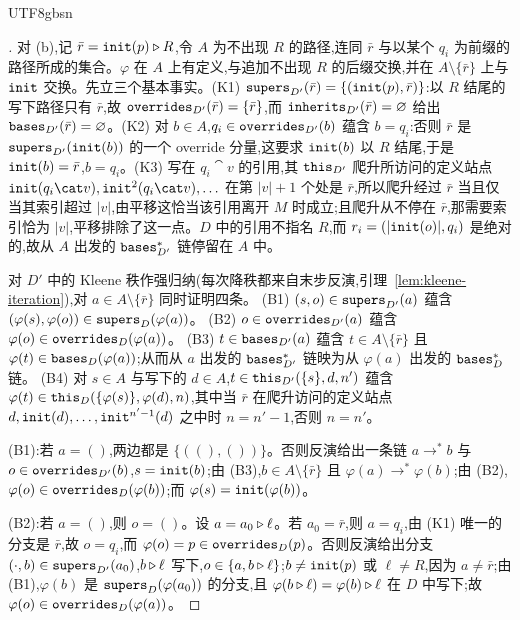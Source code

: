 \begin{CJK*}{UTF8}{gbsn}
\begin{proof}[]
\begin{sloppypar}
对 (b),记 $\bar r = \mathtt{init}(p) \mathbin{\triangleright} R$,令 $A$ 为不出现 $R$ 的路径,连同 $\bar r$ 与以某个 $q_i$ 为前缀的路径所成的集合。$\varphi$ 在 $A$ 上有定义,与追加不出现 $R$ 的后缀交换,并在 $A \setminus \{\bar r\}$ 上与 $\mathtt{init}$ 交换。先立三个基本事实。(K1) $\mathtt{supers}_{D'}(\bar r) = \{(\mathtt{init}(p), \bar r)\}$:以 $R$ 结尾的写下路径只有 $\bar r$,故 $\mathtt{overrides}_{D'}(\bar r) = \{\bar r\}$,而 $\mathtt{inherits}_{D'}(\bar r) = \varnothing$ 给出 $\mathtt{bases}_{D'}(\bar r) = \varnothing$。(K2) 对 $b \in A$,$q_i \in \mathtt{overrides}_{D'}(b)$ 蕴含 $b = q_i$:否则 $\bar r$ 是 $\mathtt{supers}_{D'}(\mathtt{init}(b))$ 的一个 override 分量,这要求 $\mathtt{init}(b)$ 以 $R$ 结尾,于是 $\mathtt{init}(b) = \bar r$,$b = q_i$。(K3) 写在 $q_i \cat v$ 的引用,其 $\mathtt{this}_{D'}$ 爬升所访问的定义站点 $\init(q_i \cat v), \init^2(q_i \cat v), \ldots$ 在第 $|v| + 1$ 个处是 $\bar r$,所以爬升经过 $\bar r$ 当且仅当其索引超过 $|v|$,由平移这恰当该引用离开 $M$ 时成立;且爬升从不停在 $\bar r$,那需要索引恰为 $|v|$,平移排除了这一点。$D$ 中的引用不指名 $R$,而 $r_i = (|\mathtt{init}(o)|, q_i)$ 是绝对的,故从 $A$ 出发的 $\mathtt{bases}^*_{D'}$ 链停留在 $A$ 中。

对 $D'$ 中的 Kleene 秩作强归纳(每次降秩都来自末步反演,引理~\ref{lem:kleene-iteration}),对 $a \in A \setminus \{\bar r\}$ 同时证明四条。
(B1) $(s, o) \in \mathtt{supers}_{D'}(a)$ 蕴含 $(\varphi(s), \varphi(o)) \in \mathtt{supers}_D(\varphi(a))$。
(B2) $o \in \mathtt{overrides}_{D'}(a)$ 蕴含 $\varphi(o) \in \mathtt{overrides}_D(\varphi(a))$。
(B3) $t \in \mathtt{bases}_{D'}(a)$ 蕴含 $t \in A \setminus \{\bar r\}$ 且 $\varphi(t) \in \mathtt{bases}_D(\varphi(a))$;从而从 $a$ 出发的 $\mathtt{bases}^*_{D'}$ 链映为从 $\varphi(a)$ 出发的 $\mathtt{bases}^*_D$ 链。
(B4) 对 $s \in A$ 与写下的 $d \in A$,$t \in \mathtt{this}_{D'}(\{s\}, d, n')$ 蕴含 $\varphi(t) \in \mathtt{this}_D(\{\varphi(s)\}, \varphi(d), n)$,其中当 $\bar r$ 在爬升访问的定义站点 $d, \mathtt{init}(d), \ldots, \mathtt{init}^{n'-1}(d)$ 之中时 $n = n' - 1$,否则 $n = n'$。

(B1):若 $a = ()$,两边都是 $\{((), ())\}$。否则反演给出一条链 $a \to^* b$ 与 $o \in \mathtt{overrides}_{D'}(b)$,$s = \mathtt{init}(b)$;由 (B3),$b \in A \setminus \{\bar r\}$ 且 $\varphi(a) \to^* \varphi(b)$;由 (B2),$\varphi(o) \in \mathtt{overrides}_D(\varphi(b))$;而 $\varphi(s) = \mathtt{init}(\varphi(b))$。

(B2):若 $a = ()$,则 $o = ()$。设 $a = a_0 \mathbin{\triangleright} \ell$。若 $a_0 = \bar r$,则 $a = q_i$,由 (K1) 唯一的分支是 $\bar r$,故 $o = q_i$,而 $\varphi(o) = p \in \mathtt{overrides}_D(p)$。否则反演给出分支 $(\cdot, b) \in \mathtt{supers}_{D'}(a_0)$,$b \mathbin{\triangleright} \ell$ 写下,$o \in \{a, b \mathbin{\triangleright} \ell\}$;$b \ne \mathtt{init}(p)$ 或 $\ell \ne R$,因为 $a \ne \bar r$;由 (B1),$\varphi(b)$ 是 $\mathtt{supers}_D(\varphi(a_0))$ 的分支,且 $\varphi(b \mathbin{\triangleright} \ell) = \varphi(b) \mathbin{\triangleright} \ell$ 在 $D$ 中写下;故 $\varphi(o) \in \mathtt{overrides}_D(\varphi(a))$。


\end{sloppypar}
\end{proof}
\end{CJK*}
